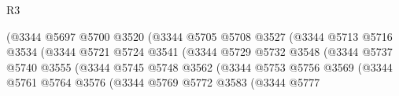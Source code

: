 \begin{lexlean}{R3}
\begin{coremodule}
                                              (@3344
                                                @5697
                                                @5700
                                                @3520
                                                (@3344
                                                  @5705
                                                  @5708
                                                  @3527
                                                  (@3344
                                                    @5713
                                                    @5716
                                                    @3534
                                                    (@3344
                                                      @5721
                                                      @5724
                                                      @3541
                                                      (@3344
                                                        @5729
                                                        @5732
                                                        @3548
                                                        (@3344
                                                          @5737
                                                          @5740
                                                          @3555
                                                          (@3344
                                                            @5745
                                                            @5748
                                                            @3562
                                                            (@3344
                                                              @5753
                                                              @5756
                                                              @3569
                                                              (@3344
                                                                @5761
                                                                @5764
                                                                @3576
                                                                (@3344
                                                                  @5769
                                                                  @5772
                                                                  @3583
                                                                  (@3344
                                                                    @5777

\end{coremodule}
\end{lexlean}
